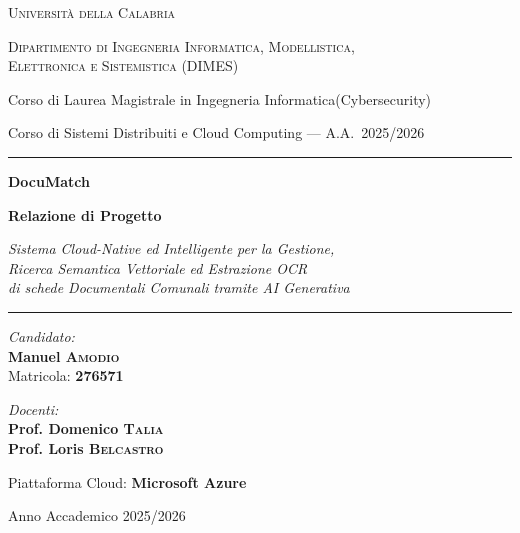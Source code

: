 \documentclass[12pt,a4paper,oneside]{report}
\begin{document}
\begin{titlepage}
    \centering
    \vspace*{0.8cm}
    {\scshape\LARGE Universit\`{a} della Calabria \par}
    \vspace{0.4cm}
    {\scshape\Large Dipartimento di Ingegneria Informatica, Modellistica,\\
    Elettronica e Sistemistica (DIMES)\par}
    \vspace{0.3cm}
    {\large Corso di Laurea Magistrale in Ingegneria Informatica(Cybersecurity)\par}
    \vspace{0.2cm}
    {\large Corso di Sistemi Distribuiti e Cloud Computing --- A.A.\ 2025/2026\par}
    \vspace{1.2cm}
    \rule{\linewidth}{1pt}
    \vspace{0.4cm}
    {\huge\bfseries DocuMatch\par}
    \vspace{0.3cm}
    {\LARGE\bfseries Relazione di Progetto\par}
    \vspace{0.2cm}
    {\Large\textit{Sistema Cloud-Native ed Intelligente per la Gestione,\\
    Ricerca Semantica Vettoriale ed Estrazione OCR\\
    di schede Documentali Comunali tramite AI Generativa}\par}
    \vspace{0.4cm}
    \rule{\linewidth}{1pt}
    \vspace{1.2cm}
    \begin{minipage}[t]{0.48\textwidth}
        \begin{flushleft}\large
            \emph{Candidato:}\\[4pt]
            \textbf{Manuel \textsc{Amodio}}\\
            Matricola: \textbf{276571}\\
        \end{flushleft}
    \end{minipage}
    \hfill
    \begin{minipage}[t]{0.48\textwidth}
        \begin{flushright}\large
            \emph{Docenti:}\\[4pt]
            \textbf{Prof. Domenico \textsc{Talia}}\\
            \textbf{Prof. Loris \textsc{Belcastro}}\\
        \end{flushright}
    \end{minipage}
    \vfill
    {\large Piattaforma Cloud: \textbf{Microsoft Azure}\par}
    \vspace{0.2cm}
    {\large Anno Accademico 2025/2026\par}
\end{titlepage}
\end{document}
